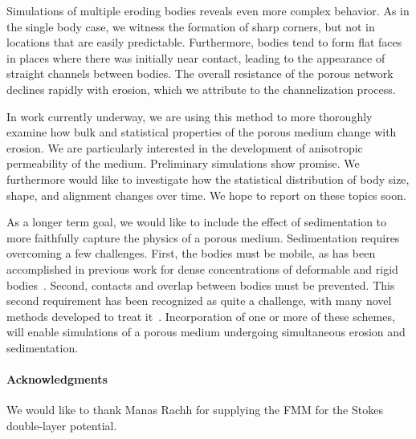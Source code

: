 \documentclass[preprint, 10pt]{elsarticle}
\begin{document}
Simulations of multiple eroding bodies reveals even more complex behavior. As in the single body case, we witness the formation of sharp corners, but not in locations that are easily predictable. Furthermore, bodies tend to form flat faces in places where there was initially near contact, leading to the appearance of straight channels between bodies. The overall resistance of the porous network declines rapidly with erosion, which we attribute to the channelization process.

In work currently underway, we are using this method to more thoroughly examine how bulk and statistical properties of the porous medium change with erosion. We are particularly interested in the development of anisotropic permeability of the medium. Preliminary simulations show promise. We furthermore would like to investigate how the statistical distribution of body size, shape, and alignment changes over time. We hope to report on these topics soon.

As a longer term goal, we would like to include the effect of sedimentation to more faithfully capture the physics of a porous medium.  Sedimentation requires overcoming a few challenges. First, the bodies must be mobile, as has been accomplished in previous work for dense concentrations of deformable and rigid bodies~\cite{qua-bir2014a, cor-gre-rac-vee2017, cor-vee2017, kli-tor2016b, rac-gre2016, qua-bir2016}. Second, contacts and overlap between bodies must be prevented. This second requirement has been recognized as quite a challenge, with many novel methods developed to treat it~\cite{lu-rah-zor2017, kab-qua-bir2018, san-mo1994}. Incorporation of one or more of these schemes, will enable simulations of a porous medium undergoing simultaneous erosion and sedimentation.


\paragraph{\bf Acknowledgments} We would like to thank Manas Rachh for supplying the FMM for the Stokes double-layer potential. 

 

\end{document}
